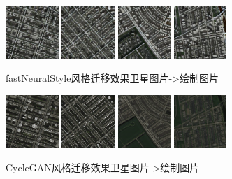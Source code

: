 \documentclass[conference]{IEEEtran}
\begin{document}
\begin{figure}[H]
	\centering
	\includegraphics[width=2cm]{PIC/maps/map1.jpg}
	\includegraphics[width=2cm]{PIC/maps/map2.jpg}
	\includegraphics[width=2cm]{PIC/maps/map3.jpg}
	\includegraphics[width=2cm]{PIC/maps/map4.jpg}
	\caption{fastNeuralStyle风格迁移效果卫星图片->绘制图片}
\end{figure}


\begin{figure}[H]
	\centering
	\includegraphics[width=2cm]{PIC/maps/1033_A_fake_A.png}
	\includegraphics[width=2cm]{PIC/maps/1037_A_fake_A.png}
	\includegraphics[width=2cm]{PIC/maps/1039_A_fake_A.png}
	\includegraphics[width=2cm]{PIC/maps/1041_A_fake_A.png}
	\caption{CycleGAN风格迁移效果卫星图片->绘制图片}
\end{figure}
\end{document}
